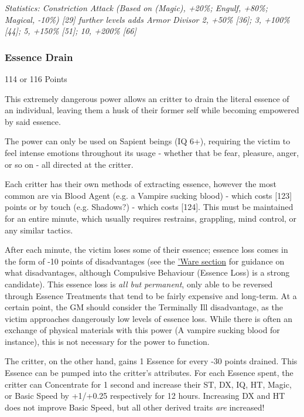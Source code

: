 \begin{multicols*}{3}
	\textcolor{OliveGreen}{\textit{Statistics: Constriction Attack (Based on (Magic), +20\%; Engulf, +80\%; Magical, -10\%) [29] further levels adds Armor Divisor 2, +50\% [36]; 3, +100\% [44]; 5, +150\% [51]; 10, +200\% [66]}}
	
	
	\subsubsection{Essence Drain}\label{essence_drain}
	\begin{flushright}
		114 or 116 Points
	\end{flushright}
		
	This extremely dangerous power allows an critter to drain the literal essence of an individual, leaving them a husk of their former self while becoming empowered by said essence.
	
	The power can only be used on Sapient beings (IQ 6+), requiring the victim to feel intense emotions throughout its usage - whether that be fear, pleasure, anger, or so on - all directed at the critter.
	
	Each critter has their own methods of extracting essence, however the most common are via Blood Agent (e.g. a Vampire sucking blood) - which costs [123] points or by touch (e.g. Shadows?) - which costs [124]. This must be maintained for an entire minute, which usually requires restrains, grappling, mind control, or any similar tactics.
	
	After each minute, the victim loses some of their essence; essence loss comes in the form of -10 points of disadvantages (see the \hyperref[ware]{'Ware section} for guidance on what disadvantages, although Compulsive Behaviour (Essence Loss) is a strong candidate). This essence loss is \textit{all but permanent}, only able to be reversed through Essence Treatments that tend to be fairly expensive and long-term. At a certain point, the GM should consider the Terminally Ill disadvantage, as the victim approaches dangerously low levels of essence loss. While there is often an exchange of physical materials with this power (A vampire sucking blood for instance), this is not necessary for the power to function.
	
	The critter, on the other hand, gains 1 Essence for every -30 points drained. This Essence can be pumped into the critter's attributes. For each Essence spent, the critter can Concentrate for 1 second and increase their ST, DX, IQ, HT, Magic, or Basic Speed by +1/+0.25 respectively for 12 hours. Increasing DX and HT does not improve Basic Speed, but all other derived traits \textit{are} increased!
	

\end{multicols*}
